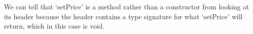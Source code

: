 We can tell that `setPrice' is a method rather than a constructor from
looking at its header because the header contains a type signature for
what `setPrice' will return, which in this case is void.
